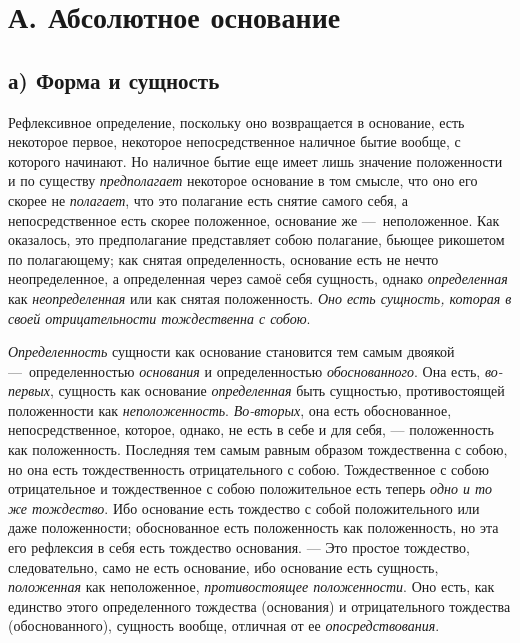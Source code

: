 \section[А. Абсолютное основание]{А. Абсолютное основание}
\subsection[а) Форма и сущность]{а) Форма и сущность}

Рефлексивное определение, поскольку оно
возвращается в основание, есть некоторое первое, некоторое непосредственное
наличное бытие вообще, с которого начинают. Но наличное бытие еще имеет
лишь значение положенности и по существу
{\em предполагает} некоторое основание в том смысле,
что оно его скорее не {\em полагает}, что это полагание
есть снятие самого себя, а непосредственное есть скорее положенное,
основание же —~неположенное. Как оказалось, это предполагание представляет
собою полагание, бьющее рикошетом по полагающему; как снятая
определенность, основание есть не нечто неопределенное, а определенная
через самоё себя сущность, однако {\em определенная}
как {\em неопределенная} или как снятая положенность.
{\em Оно есть сущность, которая в своей отрицательности
тождественна с собою}.

{\em Определенность} сущности как основание становится
тем самым двоякой —~определенностью {\em основания} и
определенностью {\em обоснованного}. Она есть,
{\em во-первых}, сущность как основание
{\em определенная} быть сущностью, противостоящей
положенности как {\em неположенность}.
{\em Во-вторых}, она есть обоснованное,
непосредственное, которое, однако, не есть в себе и для себя, —
положенность как положенность. Последняя тем самым равным образом
тождественна с собою, но она есть тождественность отрицательного с собою.
Тождественное с собою отрицательное и тождественное с собою положительное
есть теперь {\em одно и то же тождество}. Ибо основание
есть тождество с собой положительного или даже положенности; обоснованное
есть положенность как положенность, но эта его рефлексия в себя есть
тождество основания. — Это простое тождество, следовательно, само не есть
основание, ибо основание есть сущность,
{\em положенная} как неположенное,
{\em противостоящее положенности}. Оно есть, как
единство этого определенного тождества (основания) и отрицательного
тождества (обоснованного), сущность вообще, отличная от ее
{\em опосредствования}.

